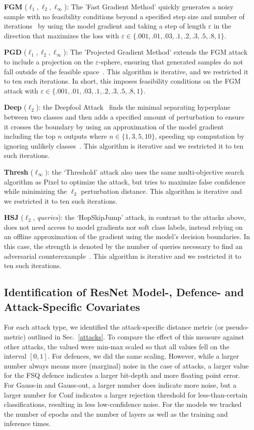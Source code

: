 \textbf{FGM} ($\ell_1, \ell_2, \ell_{\infty}$): The 'Fast Gradient Method' quickly generates a noisy sample with no feasibility conditions beyond a specified step size and number of iterations~\citep{fgm} by using the model gradient and taking a step of length $\varepsilon$ in the direction that maximizes the loss with $\varepsilon \in \{.001,.01,.03,.1,.2,.3,.5,.8,1\}$.

\textbf{PGD}  ($\ell_1, \ell_2, \ell_{\infty}$): The 'Projected Gradient Method' extends the FGM attack to include a projection on the $\varepsilon$-sphere, ensuring that generated samples do not fall outside of the feasible space~\citep{madry2017towards}. This algorithm is iterative, and we restricted it to ten such iterations. In short, this imposes feasibility conditions on the FGM attack with $\varepsilon \in \{.001,.01,.03,.1,.2,.3,.5,.8,1\}$.

\textbf{Deep} ($\ell_2$): the Deepfool Attack~\citep{deepfool} finds the minimal separating hyperplane between two classes and then adds a specified amount of perturbation to ensure it crosses the boundary by using an approximation of the model gradient including the top $n$ outputs where $n \in \{1,3,5,10\}$, speeding up computation by ignoring unlikely classes~\citep{deepfool}. This algorithm is iterative and we restricted it to ten such iterations.

 \textbf{Thresh} ($\ell_{\infty})$: the `Threshold' attack also uses the same multi-objective search algorithm as Pixel to optimize the attack, but tries to maximize false confidence while minimizing the $\ell_2$ perturbation distance. This algorithm is iterative and we restricted it to ten such iterations.
 
\textbf{HSJ} ($\ell_2$, \textit{queries}): the `HopSkipJump' attack, in contrast to the attacks above, does not need access to model gradients nor soft class labels, instead relying on an offline approximation of the gradient using the model's decision boundaries. In this case, the strength is denoted by the number of queries necessary to find an adversarial counterexample~\citep{hopskipjump}. This algorithm is iterative and we restricted it to ten such iterations.

\subsection{Identification of ResNet Model-, Defence- and Attack-Specific Covariates}
For each attack type, we identified the attack-specific distance metric (or pseudo-metric) outlined in Sec.~\ref{attacks}. To compare the effect of this measure against other attacks, the valued were min-max scaled so that all values fell on the interval $[0,1]$. For defences, we did the same scaling. However, while a larger number always means more (marginal) noise in the case of attacks, a larger value for the FSQ defence indicates a larger bit-depth and more floating point error. For Gauss-in and Gauss-out, a larger number does indicate more noise, but a larger number for Conf indicates a larger rejection threshold for less-than-certain classifications, resulting in less low-confidence noise. For the models we tracked the number of epochs and the number of layers as well as the training and inference times. 


